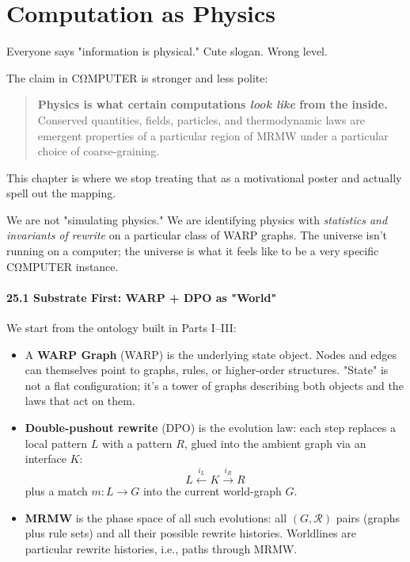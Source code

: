 \chapter{Computation as Physics}
\label{sec:computation-as-physics}

Everyone says "information is physical." Cute slogan. Wrong level.

The claim in CΩMPUTER is stronger and less polite:

\begin{quote}
\textbf{Physics is what certain computations \emph{look like} from the inside.}\\
Conserved quantities, fields, particles, and thermodynamic laws are emergent
properties of a particular region of MRMW under a particular choice of coarse-graining.
\end{quote}

This chapter is where we stop treating that as a motivational poster and actually
spell out the mapping.

We are not "simulating physics." We are identifying physics with
\emph{statistics and invariants of rewrite} on a particular class of WARP graphs.
The universe isn’t running on a computer; the universe is what it feels like
to be a very specific CΩMPUTER instance.

\subsubsection*{25.1  Substrate First: WARP + DPO as "World"}

We start from the ontology built in Parts I–III:

\begin{itemize}
  \item A \textbf{WARP Graph} (WARP) is the underlying state object.
        Nodes and edges can themselves point to graphs, rules, or higher-order
        structures. "State" is not a flat configuration; it's a tower of graphs
        describing both objects and the laws that act on them.

  \item \textbf{Double-pushout rewrite} (DPO) is the evolution law:
        each step replaces a local pattern $L$ with a pattern $R$, glued into
        the ambient graph via an interface $K$:
        \[
          L \xleftarrow{i_L} K \xrightarrow{i_R} R
        \]
        plus a match $m : L \to G$ into the current world-graph $G$.

  \item \textbf{MRMW} is the phase space of all such evolutions:
        all $(G, \mathcal{R})$ pairs (graphs plus rule sets) and all their
        possible rewrite histories. Worldlines are particular rewrite histories,
        i.e., paths through MRMW.
\end{itemize}

